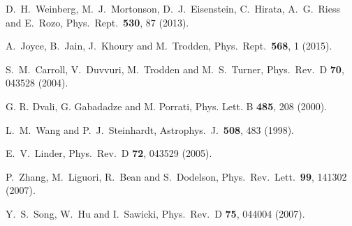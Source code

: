 \documentclass[aps,prd,nofootinbib,amsmath,amssymb,twocolumn,superscriptaddress,10pt]{revtex4}%
\begin{document}
\begin{thebibliography}{}
  D.~H.~Weinberg, M.~J.~Mortonson, D.~J.~Eisenstein, C.~Hirata, A.~G.~Riess and E.~Rozo,
  Phys.\ Rept.\  {\bf 530}, 87 (2013).

  A.~Joyce, B.~Jain, J.~Khoury and M.~Trodden,
  Phys.\ Rept.\  {\bf 568}, 1 (2015).


  S.~M.~Carroll, V.~Duvvuri, M.~Trodden and M.~S.~Turner,
  Phys.\ Rev.\ D {\bf 70}, 043528 (2004).

G. R. Dvali, G. Gabadadze and M. Porrati,
Phys. Lett. B {\bf 485}, 208 (2000).

  L.~M.~Wang and P.~J.~Steinhardt,
  Astrophys.\ J.\  {\bf 508}, 483 (1998).

  E.~V.~Linder,
  Phys.\ Rev.\ D {\bf 72}, 043529 (2005).

  P.~Zhang, M.~Liguori, R.~Bean and S.~Dodelson,
  Phys.\ Rev.\ Lett.\  {\bf 99}, 141302 (2007).



  Y.~S.~Song, W.~Hu and I.~Sawicki,
  Phys.\ Rev.\ D {\bf 75}, 044004 (2007).




\end{thebibliography}
\end{document}
